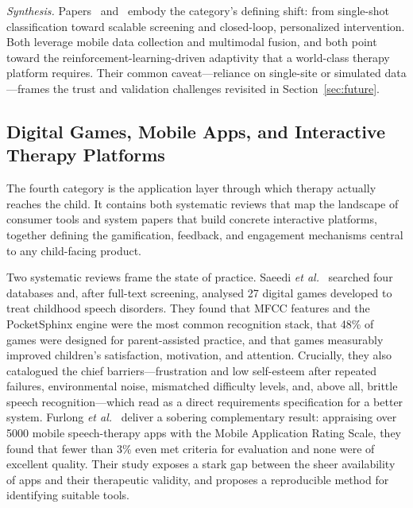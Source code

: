 \documentclass[conference]{IEEEtran}
\begin{document}
\emph{Synthesis.} Papers~\cite{ref10} and~\cite{ref11} embody the category's defining shift: from single-shot classification toward scalable screening and closed-loop, personalized intervention. Both leverage mobile data collection and multimodal fusion, and both point toward the reinforcement-learning-driven adaptivity that a world-class therapy platform requires. Their common caveat---reliance on single-site or simulated data---frames the trust and validation challenges revisited in Section~\ref{sec:future}.

\subsection{Digital Games, Mobile Apps, and Interactive Therapy Platforms}
The fourth category is the application layer through which therapy actually reaches the child. It contains both systematic reviews that map the landscape of consumer tools and system papers that build concrete interactive platforms, together defining the gamification, feedback, and engagement mechanisms central to any child-facing product.

Two systematic reviews frame the state of practice. Saeedi \textit{et al.}~\cite{ref12} searched four databases and, after full-text screening, analysed 27 digital games developed to treat childhood speech disorders. They found that MFCC features and the PocketSphinx engine were the most common recognition stack, that 48\% of games were designed for parent-assisted practice, and that games measurably improved children's satisfaction, motivation, and attention. Crucially, they also catalogued the chief barriers---frustration and low self-esteem after repeated failures, environmental noise, mismatched difficulty levels, and, above all, brittle speech recognition---which read as a direct requirements specification for a better system. Furlong \textit{et al.}~\cite{ref13} deliver a sobering complementary result: appraising over 5000 mobile speech-therapy apps with the Mobile Application Rating Scale, they found that fewer than 3\% even met criteria for evaluation and none were of excellent quality. Their study exposes a stark gap between the sheer availability of apps and their therapeutic validity, and proposes a reproducible method for identifying suitable tools.
\end{document}
